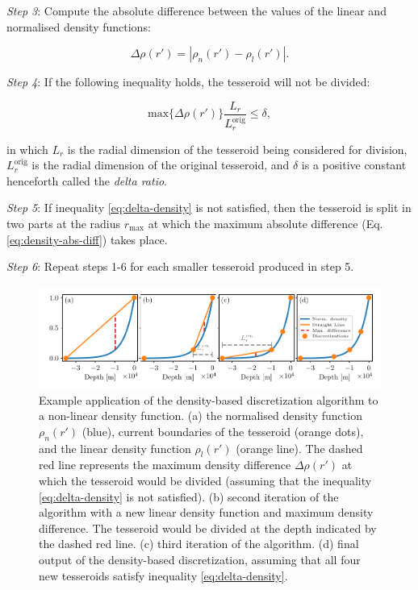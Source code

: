 \documentclass[extra]{gji}
\begin{document}
\textit{Step 3}:
Compute the absolute difference between the values of the linear and normalised density
functions:

\begin{equation}
    \Delta \rho (r') = | \rho_n(r') - \rho_l(r') |.
    \label{eq:density-abs-diff}
\end{equation}

\textit{Step 4}:
If the following inequality holds, the tesseroid will not be divided:

\begin{equation}
    \text{max}\{ \Delta \rho(r') \} \frac{L_r}{L_r^\text{orig}} \le \delta,
    \label{eq:delta-density}
\end{equation}

\noindent
in which $L_r$ is the radial dimension of the tesseroid being considered for division,
$L_r^\text{orig}$ is the radial dimension of the original tesseroid, and
$\delta$ is a positive constant henceforth called the \textit{delta ratio}.

\textit{Step 5}:
If inequality \ref{eq:delta-density} is not satisfied, then the tesseroid is split in
two parts at the radius $r_\text{max}$ at which the maximum absolute difference (Eq.
\ref{eq:density-abs-diff}) takes place.

\textit{Step 6}:
Repeat steps 1-6 for each smaller tesseroid produced in step 5.

\begin{figure}
\centering
\includegraphics[width=\linewidth]
    {figures/density-based-discretization-algorithm.pdf}
\caption{
    Example application of the density-based discretization algorithm to a non-linear
    density function.
    (a) the normalised density function $\rho_n(r')$ (blue), current boundaries of the
    tesseroid (orange dots), and the linear density function $\rho_l(r')$ (orange line).
    The dashed red line represents the maximum density difference $\Delta \rho (r')$ at
    which the tesseroid would be divided (assuming that the inequality
    \ref{eq:delta-density} is not satisfied).
    (b) second iteration of the algorithm with a new linear density function and maximum
    density difference. The tesseroid would be divided at the depth indicated by the
    dashed red line.
    (c) third iteration of the algorithm.
    (d) final output of the density-based discretization, assuming that all four new
    tesseroids satisfy inequality \ref{eq:delta-density}.
}
\label{fig:density-discretization-algorithm}
\end{figure}
\end{document}
